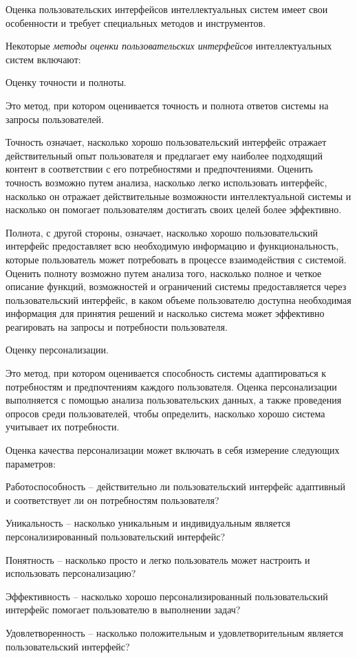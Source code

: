 Оценка пользовательских интерфейсов интеллектуальных систем имеет свои особенности и требует специальных методов и инструментов.

Некоторые \textit{методы оценки пользовательских интерфейсов} интеллектуальных систем включают:
\begin{textitemize}
	\item Оценку точности и полноты. 
	
	Это метод, при котором оценивается точность и полнота ответов системы на запросы пользователей.
	
	Точность означает, насколько хорошо пользовательский интерфейс отражает действительный опыт пользователя и предлагает ему наиболее подходящий контент в соответствии с его потребностями и предпочтениями. Оценить точность возможно путем анализа, насколько легко использовать интерфейс, насколько он отражает действительные возможности интеллектуальной системы и насколько он помогает пользователям достигать своих целей более эффективно.
	
	Полнота, с другой стороны, означает, насколько хорошо пользовательский интерфейс предоставляет всю необходимую информацию и функциональность, которые пользователь может потребовать в процессе взаимодействия с системой. Оценить полноту возможно путем анализа того, насколько полное и четкое описание функций, возможностей и ограничений системы предоставляется через пользовательский интерфейс, в каком объеме пользователю доступна необходимая информация для принятия решений и насколько система может эффективно реагировать на запросы и потребности пользователя.
	
	\item Оценку персонализации. 
	
	Это метод, при котором оценивается способность системы адаптироваться к потребностям и предпочтениям каждого пользователя. Оценка персонализации выполняется с помощью анализа пользовательских данных, а также проведения опросов среди пользователей, чтобы определить, насколько хорошо система учитывает их потребности.
	
	Оценка качества персонализации может включать в себя измерение следующих параметров:
	\begin{textitemize}
	\item Работоспособность -- действительно ли пользовательский интерфейс адаптивный и соответствует ли он потребностям пользователя?
	\item Уникальность -- насколько уникальным и индивидуальным является персонализированный пользовательский интерфейс?
	\item Понятность -- насколько просто и легко пользователь может настроить и использовать персонализацию?
	\item Эффективность -- насколько хорошо персонализированный пользовательский интерфейс помогает пользователю в выполнении задач?
	\item Удовлетворенность -- насколько положительным и удовлетворительным является пользовательский интерфейс?
	\end{textitemize}


\end{textitemize}
